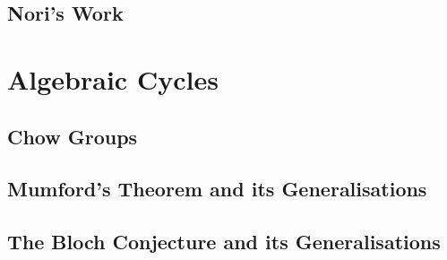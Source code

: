 \documentclass[oneside]{amsbook}
\begin{document}
\chapter{Nori's Work}


\part{Algebraic Cycles}
\chapter{Chow Groups}


\chapter{Mumford's Theorem and its Generalisations}


\chapter{The Bloch Conjecture and its Generalisations}

\end{document}
